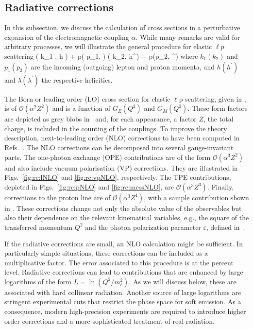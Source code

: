  
\subsection{Radiative corrections}\label{Sec:RadCorrAdrian}

In this subsection, we discuss the calculation of cross sections in a
perturbative expansion of the electromagnetic coupling $\alpha$. While
many remarks are valid for arbitrary processes, we will illustrate the
general procedure for elastic $\ell p$ scattering \beq
\ell( k_1 , h ) + p( p_1, \lambda ) \to \ell( k_2, h^\prime) + p(p_2, \lambda^\prime) \label{eq:eq1}
\eeq
where $k_1(k_2)$ and $p_1(p_2)$ are the incoming (outgoing) lepton and proton momenta, and $h(h^\prime)$ and $\lambda(\lambda^\prime)$ the respective helicities.

The Born or leading order (LO) cross section for elastic $\ell$p scattering, given in , is of
$\mathcal{O}(\alpha^2 Z^2)$ and is a function of $G_E(Q^2)$ and $G_M(Q^2)$.  These form factors are depicted as grey blobs
in~ and, for each appearance, a factor $Z$, the total charge, is included in
the counting of the couplings. To improve the theory description,
next-to-leading order (NLO) corrections to  have been
computed in Refs.~\cite{Maximon:2000hm, Mo:1968cg, Ent:2001hm,
  Gramolin:2014pva, Gerasimov:2015aoa, Bystritskiy:2007hw}. The NLO
corrections can be decomposed into several gauge-invariant parts. The one-photon exchange (OPE) contributions are of the form
$\mathcal{O}(\alpha^3 Z^2)$ and also include vacuum polarisation (VP)
corrections. They are illustrated in Figs.~\ref{fig:rc:lNLO} and
\ref{fig:rc:vpNLO}, respectively. The TPE
contributions, depicted in
Figs.~\ref{fig:rc:pNLO} and \ref{fig:rc:messNLO}, are $\mathcal{O}(\alpha^3 Z^3)$. Finally, corrections to the
proton line are of $\mathcal{O}(\alpha^3 Z^4)$, with a sample
contribution shown in . These corrections change
not only the absolute value of the observables but also their
dependence on the relevant kinematical variables, e.g., the square of
the transferred momentum $Q^2$ and the photon polarization
parameter $\varepsilon$, defined in~.

If the radiative corrections are small, an NLO calculation might be
sufficient. In particularly simple situations, these corrections can be
included as a multiplicative factor. The
error associated to this procedure is at the percent level. Radiative corrections can lead to
contributions that are enhanced by large logarithms of the form
$L=\ln{(Q^2/m_\ell^2)}$.  As we will discuss below, these are associated with hard
collinear radiation. Another source of large logarithms are stringent
experimental cuts that restrict the phase space for soft emission. As a consequence, modern high-precision experiments are required to introduce higher order corrections
and a more sophisticated treatment of real radiation.



